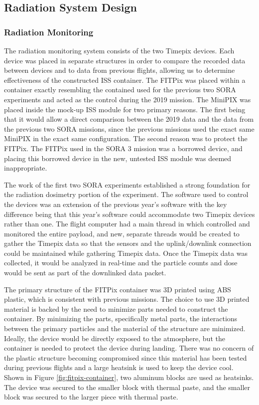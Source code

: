 \subsection{Radiation System Design}
\label{sec:Radiation-Design}

\subsubsection{Radiation Monitoring}
The radiation monitoring system consists of the two Timepix devices.
Each device was placed in separate structures in order to compare the recorded data between devices and to data from previous flights, allowing us to determine effectiveness of the constructed ISS container.
The FITPix was placed within a container exactly resembling the contained used for the previous two SORA experiments and acted as the control during the 2019 mission.
The MiniPIX was placed inside the mock-up ISS module for two primary reasons.
The first being that it would allow a direct comparison between the 2019 data and the data from the previous two SORA missions, since the previous missions used the exact same MiniPIX in the exact same configuration.
The second reason was to protect the FITPix.
The FITPix used in the SORA 3 mission was a borrowed device, and placing this borrowed device in the new, untested ISS module was deemed inappropriate.

The work of the first two SORA experiments \cite{SORA1} \cite{SORA2} established a strong foundation for the radiation dosimetry portion of the experiment.
The software used to control the devices was an extension of the previous year's software with the key difference being that this year's software could accommodate two Timepix devices rather than one. 
The flight computer had a main thread in which controlled and monitored the entire payload, and new, separate threads would be created to gather the Timepix data so that the sensors and the uplink/downlink connection could be maintained while gathering Timepix data.
Once the Timepix data was collected, it would be analyzed in real-time and the particle counts and dose would be sent as part of the downlinked data packet. 

The primary structure of the FITPix container was 3D printed using ABS plastic, which is consistent with previous missions.
The choice to use 3D printed material is backed by the need to minimize parts needed to construct the container.
By minimizing the parts, specifically metal parts, the interactions between the primary particles and the material of the structure are minimized.
Ideally, the device would be directly exposed to the atmosphere, but the container is needed to protect the device during landing. 
There was no concern of the plastic structure becoming compromised since this material has been tested during previous flights and a large heatsink is used to keep the device cool.
Shown in Figure \ref{fig:fitpix-container}, two aluminum blocks are used as heatsinks.
The device was secured to the smaller block with thermal paste, and the smaller block was secured to the larger piece with thermal paste. 


